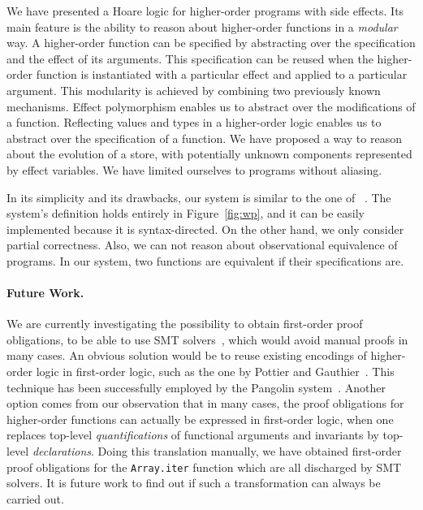 \documentclass[a4paper]{llncs}
\begin{document}
We have presented a Hoare logic for higher-order programs with side
effects. Its main feature is the ability to reason about higher-order
functions in a {\em modular} way. A higher-order function can be
specified by abstracting over the specification and the effect of its
arguments. This specification can be reused when the higher-order
function is instantiated with a particular effect and applied to a
particular argument. This modularity is achieved by combining two
previously known mechanisms. Effect polymorphism enables us to
abstract over the modifications of a function. Reflecting values and
types in a higher-order logic enables us to abstract over the
specification of a function. We have proposed a way to
reason about the evolution of a store, with potentially unknown
components represented by effect variables. We have limited ourselves to
programs without aliasing.

In its simplicity and its drawbacks, our system is similar to the one
of ~\cite{regis-gianas-pottier-08}. The system's definition holds
entirely in Figure~\ref{fig:wp}, and it can be easily
implemented because it is syntax-directed. On the other hand, we only
consider partial correctness. Also, we can not reason about
observational equivalence of programs. In our system, two functions
are equivalent if their specifications are.


\paragraph{Future Work.}

We are currently investigating the possibility to obtain first-order proof
obligations, to be able to use SMT solvers~\cite{RanTin-SMTLIB}, which would
avoid manual proofs in many cases. An obvious solution would be to reuse
existing encodings of higher-order logic in first-order logic, such as the one
by Pottier and Gauthier~\cite{pottier-gauthier-hosc}. This technique has been
successfully employed by the Pangolin system~\cite{regis-gianas-pottier-08}.
Another option comes from our observation that in many cases, the proof
obligations for higher-order functions can actually be expressed in
first-order logic, when one replaces top-level {\em quantifications} of
functional arguments and invariants by top-level {\em declarations}. Doing
this translation manually, we have obtained first-order proof
obligations for the {\tt Array.iter} function which are all discharged by
SMT solvers. It is future work to find out if such a transformation can always
be carried out.
\end{document}
